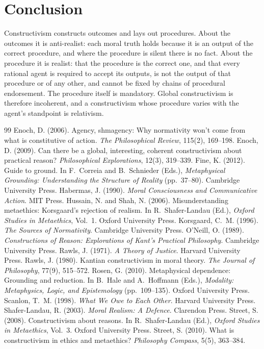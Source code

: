\documentclass{situationist-preprint}
\begin{document}
\section{Conclusion}

Constructivism constructs outcomes and lays out procedures. About the outcomes it is anti-realist: each moral truth holds because it is an output of the correct procedure, and where the procedure is silent there is no fact. About the procedure it is realist: that the procedure is the correct one, and that every rational agent is required to accept its outputs, is not the output of that procedure or of any other, and cannot be fixed by chains of procedural endorsement. The procedure itself is mandatory. Global constructivism is therefore incoherent, and a constructivism whose procedure varies with the agent's standpoint is relativism.

\begin{thebibliography}{99}\small
{} Enoch, D. (2006). Agency, shmagency: Why normativity won't come from what is constitutive of action. \emph{The Philosophical Review}, 115(2), 169--198.
 Enoch, D. (2009). Can there be a global, interesting, coherent constructivism about practical reason? \emph{Philosophical Explorations}, 12(3), 319--339.
 Fine, K. (2012). Guide to ground. In F.~Correia and B.~Schnieder (Eds.), \emph{Metaphysical Grounding: Understanding the Structure of Reality} (pp.~37--80). Cambridge University Press.
 Habermas, J. (1990). \emph{Moral Consciousness and Communicative Action}. MIT Press.
 Hussain, N. and Shah, N. (2006). Misunderstanding metaethics: Korsgaard's rejection of realism. In R.~Shafer-Landau (Ed.), \emph{Oxford Studies in Metaethics}, Vol.~1. Oxford University Press.
 Korsgaard, C.~M. (1996). \emph{The Sources of Normativity}. Cambridge University Press.
 O'Neill, O. (1989). \emph{Constructions of Reason: Explorations of Kant's Practical Philosophy}. Cambridge University Press.
 Rawls, J. (1971). \emph{A Theory of Justice}. Harvard University Press.
 Rawls, J. (1980). Kantian constructivism in moral theory. \emph{The Journal of Philosophy}, 77(9), 515--572.
 Rosen, G. (2010). Metaphysical dependence: Grounding and reduction. In B.~Hale and A.~Hoffmann (Eds.), \emph{Modality: Metaphysics, Logic, and Epistemology} (pp.~109--135). Oxford University Press.
 Scanlon, T.~M. (1998). \emph{What We Owe to Each Other}. Harvard University Press.
 Shafer-Landau, R. (2003). \emph{Moral Realism: A Defence}. Clarendon Press.
 Street, S. (2008). Constructivism about reasons. In R.~Shafer-Landau (Ed.), \emph{Oxford Studies in Metaethics}, Vol.~3. Oxford University Press.
 Street, S. (2010). What is constructivism in ethics and metaethics? \emph{Philosophy Compass}, 5(5), 363--384.
\end{thebibliography}
\end{document}
